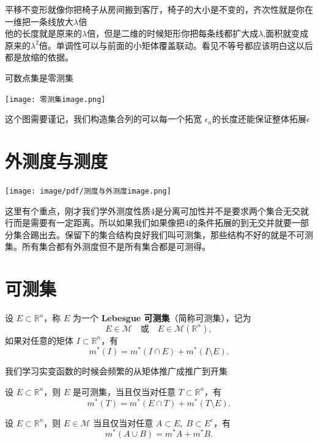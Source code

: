 \documentclass[lang=cn,10pt]{elegantbook}
\begin{document}
平移不变形就像你把椅子从房间搬到客厅，椅子的大小是不变的，齐次性就是你在一维把一条线放大$\lambda$倍\\
他的长度就是原来的$\lambda$倍，但是二维的时候矩形你把每条线都扩大成$\lambda$,面积就变成原来的$\lambda^2$倍。单调性可以与前面的小矩体覆盖联动。看见不等号都应该明白这以后都是放缩的依据。
\begin{definition}[零测集]
    可数点集是零测集
\end{definition}
\begin{center}
    

\texttt{[image: 零测集image.png]}
\end{center}
这个图需要谨记，我们构造集合列的可以每一个拓宽 $\epsilon_n$的长度还能保证整体拓展$\epsilon$

\section{外测度与测度}
\begin{center}
    

\texttt{[image: image/pdf/测度与外测度image.png]}
\end{center}
这里有个重点，刚才我们学外测度性质4是分离可加性并不是要求两个集合无交就行而是需要有一定距离。所以如果我们如果像把4的条件拓展的到无交并就要一部分集合踢出去。保留下的集合结构良好我们叫可测集，那些结构不好的就是不可测集。所有集合都有外测度但不是所有集合都是可测得。
\section{可测集}
\begin{definition}[可测集]
设 $E \subset \mathbb{R}^n$，称 $E$ 为一个 \textbf{Lebesgue 可测集}（简称可测集），记为
\[
E \in \mathcal{M} \quad \text{或} \quad E \in \mathcal{M}(\mathbb{R}^n),
\]
如果对任意的矩体 $I \subset \mathbb{R}^n$，有
\[
m^*(I) = m^*(I \cap E) + m^*(I \setminus E).
\]
\end{definition}
我们学习实变函数的时候会频繁的从矩体推广成推广到开集
\begin{theorem}[Carathéodory 条件]
设 $E \subset \mathbb{R}^n$，则 $E$ 是可测集，当且仅当对任意 $T \subset \mathbb{R}^n$，有
\[
m^*(T) = m^*(E \cap T) + m^*(T \setminus E).
\]
\end{theorem}
\begin{theorem}[可测集的可加性]
设 $E \subset \mathbb{R}^n$，则 $E \in \mathcal{M}$ 当且仅当对任意 $A \subset E, \; B \subset E^c$，有
\[
m^*(A \cup B) = m^* A + m^* B.
\]
\end{theorem}
\end{document}
